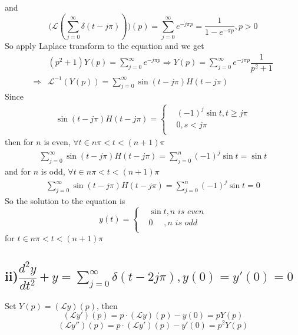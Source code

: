 \documentclass[a4paper,12pt,titlepage]{article}
\begin{document}
and
$$\Big(\mathcal{L}(\sum\limits_{j=0}^{\infty}\delta(t-j\pi))\Big)(p)=\sum\limits_{j=0}^{\infty}e^{-j\pi p}=\dfrac{1}{1-e^{-\pi p}},p>0$$
So apply Laplace transform to the equation and we get
\begin{align*}
&(p^2+1)Y(p)=\sum\limits_{j=0}^{\infty}e^{-j\pi p}\Rightarrow Y(p)=\sum\limits_{j=0}^{\infty}e^{-j\pi p}\dfrac{1}{p^2+1}\\
\Rightarrow& \mathcal{L}^{-1}(Y(p))=\sum\limits_{j=0}^{\infty}\sin (t-j\pi)H(t-j\pi)
\end{align*}
Since
\begin{align*}
\sin (t-j\pi)H(t-j\pi)=\left\{
\begin{aligned}
&(-1)^j\sin t,t\geqslant j\pi\\
&0,s<j\pi\\
\end{aligned}
\right.
\end{align*}
then for  $n$ is even, $\forall t\in n\pi<t<(n+1)\pi$ 
\begin{align*}
\sum\limits_{j=0}^{\infty}\sin (t-j\pi)H(t-j\pi)=\sum\limits_{j=0}^{n}(-1)^{j}\sin t=\sin t
\end{align*}
and for  $n$ is odd, $\forall t\in n\pi<t<(n+1)\pi$ 
\begin{align*}
\sum\limits_{j=0}^{\infty}\sin (t-j\pi)H(t-j\pi)=\sum\limits_{j=0}^{n}(-1)^{j}\sin t=0
\end{align*}
So the solution to the equation is $$y(t)=\left\{
\begin{aligned}
&\sin t,n\,\,is\,\,even\\
&0\,\,\,\,\,\,\,\,,n\,\,is\,\,odd\\
\end{aligned}
\right.$$
for $ t\in n\pi<t<(n+1)\pi$

\subsection*{ii)$ \dfrac{d^2y}{dt^2}+y=\sum\limits_{j=0}^{\infty}\delta(t-2j\pi),y(0)=y'(0)=0 $}
Set $Y(p)=(\mathcal{L}y)(p)$, then
$$(\mathcal{L}y')(p)=p\cdot(\mathcal{L}y)(p)-y(0)=pY(p) $$
$$(\mathcal{L}y'')(p)=p\cdot(\mathcal{L}y')(p)-y'(0)=p^2Y(p) $$
\end{document}
